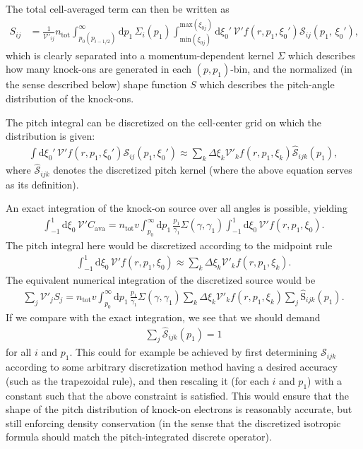 \documentclass[11pt,a4paper]{article}
\newcommand{\rd}{\ensuremath{\mathrm{d}}}
\newcommand{\sub}[1]{\ensuremath{_{\text{#1}}}}
\newcommand{\Vp}{\ensuremath{\mathcal{V}'} }
\begin{document}
The total cell-averaged term can then be written as
\begin{align}
S_{ij} &= \frac{1}{\Vp_{ij}}n\sub{tot} \int_{p_0(p_{i-1/2})}^\infty\rd p_1 \,\Sigma_i(p_1)\int_{\mathrm{min}(\xi_{0j})}^{\mathrm{max}(\xi_{0j})} \rd \xi_0' \, \Vp f(r,p_1,\xi_0') \mathcal{S}_{ij}(p_1,\,\xi_0'), 
\end{align}
which is clearly separated into a momentum-dependent kernel $\Sigma$ which describes how many knock-ons are generated in each $(p,p_1)$-bin, and the normalized (in the sense described below) shape function $S$ which describes the pitch-angle distribution of the knock-ons.

The pitch integral can be discretized on the cell-center grid on which the distribution is given:
\begin{align}
\int \rd \xi_0' \, \Vp f(r,p_1,\xi_0') \mathcal{S}_{ij}(p_1,\xi_0') \approx \sum_k  \Delta \xi_k \Vp_k f(r,p_1,\xi_k)\hat{\mathcal{S}}_{ijk}(p_1),
\end{align}
where $\hat{\mathcal{S}}_{ijk}$ denotes the discretized pitch kernel (where the above equation serves as its definition).

An exact integration of the knock-on source over all angles is possible, yielding
\begin{align}
\int_{-1}^1 \rd \xi_0 \,\Vp C\sub{ava} = n\sub{tot} v\int_{p_0}^\infty \rd p_1 \,\frac{p_1}{\gamma_1}\Sigma(\gamma,\gamma_1) \int_{-1}^1 \rd \xi_0 \,\mathcal{V}' f(r,p_1,\xi_0).
\end{align}
The pitch integral here would be discretized according to the midpoint rule
\begin{align}
\int_{-1}^1\rd\xi_0\,\Vp f(r,p_1,\xi_0) \approx \sum_k \Delta \xi_k \Vp_k f(r,p_1,\xi_k).
\end{align}
The equivalent numerical integration of the discretized source would be
\begin{align}
\sum_j \Vp_j S_j = n\sub{tot} v\int_{p_0}^\infty \rd p_1 \,\frac{p_1}{\gamma_1}\Sigma(\gamma,\gamma_1)\sum_k \Delta \xi_k \Vp_k f(r,p_1,\xi_k)\sum_j \hat{\mathrm{S}}_{ijk}(p_1).
\end{align}
If we compare with the exact integration, we see that we should demand
\begin{align}
\sum_j  \hat{\mathcal{S}}_{ijk}(p_1) = 1
\end{align}
for all $i$ and $p_1$. This could for example be achieved by first determining $\mathcal{S}_{ijk}$ according to some arbitrary discretization method having a desired accuracy (such as the trapezoidal rule), and then rescaling it (for each $i$ and $p_1$) with a constant such that the above constraint is satisfied. This would ensure that the shape of the pitch distribution of knock-on electrons is reasonably accurate, but still enforcing density conservation (in the sense that the discretized isotropic formula should match the pitch-integrated discrete operator).
\end{document}
